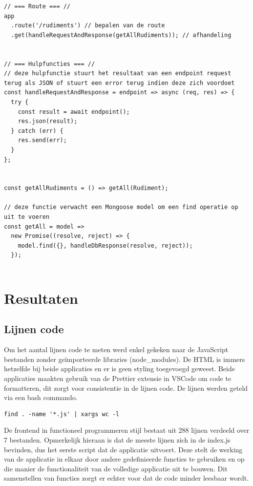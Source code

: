 \begin{lstlisting}[caption=Afhandelen van de rudiments route - FP]
// === Route === //
app
  .route('/rudiments') // bepalen van de route
  .get(handleRequestAndResponse(getAllRudiments)); // afhandeling


// === Hulpfuncties === //
// deze hulpfunctie stuurt het resultaat van een endpoint request terug als JSON of stuurt een error terug indien deze zich voordoet
const handleRequestAndResponse = endpoint => async (req, res) => {
  try {
    const result = await endpoint();
    res.json(result);
  } catch (err) {
    res.send(err);
  }
};


const getAllRudiments = () => getAll(Rudiment);

// deze functie verwacht een Mongoose model om een find operatie op uit te voeren
const getAll = model =>
  new Promise((resolve, reject) => {
    model.find({}, handleDbResponse(resolve, reject));
  });


\end{lstlisting}

\section{Resultaten}
\subsection{Lijnen code}
Om het aantal lijnen code te meten werd enkel gekeken naar de JavaScript bestanden zonder geïmporteerde libraries (node\_modules). De HTML is immers hetzelfde bij beide applicaties en er is geen styling toegevoegd geweest. Beide applicaties maakten gebruik van de Prettier extensie in VSCode om code te formatteren, dit zorgt voor consistentie in de lijnen code. De lijnen werden geteld via een bash commando. 

\begin{lstlisting}[caption=Bash commando]
    find . -name '*.js' | xargs wc -l
 \end{lstlisting}

 De frontend in functioneel programmeren stijl bestaat uit 288 lijnen verdeeld over 7 bestanden. Opmerkelijk hieraan is dat de meeste lijnen zich in de index.js bevinden, dus het eerste script dat de applicatie uitvoert. Deze stelt de werking van de applicatie in elkaar door andere gedefinieerde functies te gebruiken en op die manier de functionaliteit van de volledige applicatie uit te bouwen. Dit samenstellen van functies zorgt er echter voor dat de code minder leesbaar wordt.

